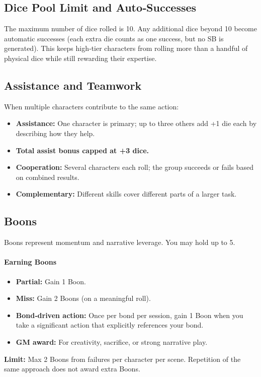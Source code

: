 \subsection{Dice Pool Limit and Auto‑Successes}\label{subsec:dice_pool_limit}

The maximum number of dice rolled is 10. Any additional dice beyond 10 become
automatic successes (each extra die counts as one success, but no SB is
generated). This keeps high‑tier characters from rolling more than a handful of
physical dice while still rewarding their expertise.

\subsection{Assistance and Teamwork}\label{subsec:assistance}

When multiple characters contribute to the same action:
\begin{itemize}
    \item \textbf{Assistance:} One character is primary; up to three others add
        +1 die each by describing how they help.
    \item \textbf{Total assist bonus capped at +3 dice.}
    \item \textbf{Cooperation:} Several characters each roll; the group succeeds
        or fails based on combined results.
    \item \textbf{Complementary:} Different skills cover different parts of a
        larger task.
\end{itemize}

\subsection{Boons}\label{subsec:boons}

Boons represent momentum and narrative leverage. You may hold up to 5.

\paragraph{Earning Boons}
\begin{itemize}
    \item \textbf{Partial:} Gain 1 Boon.
    \item \textbf{Miss:} Gain 2 Boons (on a meaningful roll).
    \item \textbf{Bond‑driven action:} Once per bond per session, gain 1 Boon
        when you take a significant action that explicitly references your bond.
    \item \textbf{GM award:} For creativity, sacrifice, or strong narrative play.
\end{itemize}
\noindent \textbf{Limit:} Max 2 Boons from failures per character per scene.
Repetition of the same approach does not award extra Boons.

